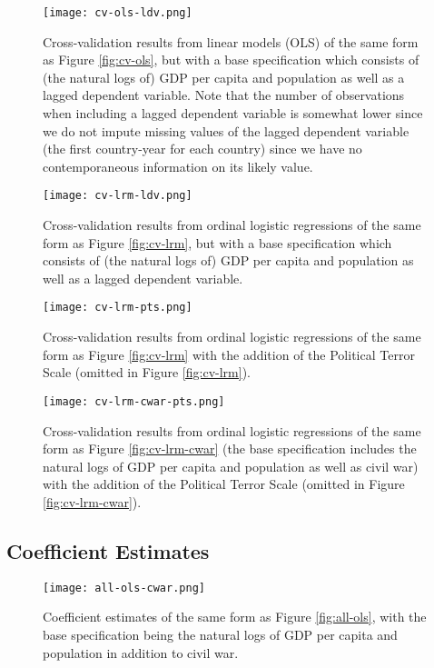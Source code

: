 \documentclass[12pt]{article}
\begin{document}
\begin{figure}[!htpb]
\texttt{[image: cv-ols-ldv.png]}
\caption{Cross-validation results from linear models (OLS) of the same form as Figure \ref{fig:cv-ols}, but with a base specification which consists of (the natural logs of) GDP per capita and population as well as a lagged dependent variable. Note that the number of observations when including a lagged dependent variable is somewhat lower since we do not impute missing values of the lagged dependent variable (the first country-year for each country) since we have no contemporaneous information on its likely value.}
\label{fig:cv-ols-ldv}
\end{figure}

\begin{figure}[!htpb]
\texttt{[image: cv-lrm-ldv.png]}
\caption{Cross-validation results from ordinal logistic regressions of the same form as Figure \ref{fig:cv-lrm}, but with a base specification which consists of (the natural logs of) GDP per capita and population as well as a lagged dependent variable.}
\label{fig:cv-lrm-ldv}
\end{figure}

\begin{figure}[!htpb]
\texttt{[image: cv-lrm-pts.png]}
\caption{Cross-validation results from ordinal logistic regressions of the same form as Figure \ref{fig:cv-lrm} with the addition of the Political Terror Scale (omitted in Figure \ref{fig:cv-lrm}).}
\label{fig:cv-lrm-pts}
\end{figure}

\begin{figure}[!htpb]
\texttt{[image: cv-lrm-cwar-pts.png]}
\caption{Cross-validation results from ordinal logistic regressions of the same form as Figure \ref{fig:cv-lrm-cwar} (the base specification includes the natural logs of GDP per capita and population as well as civil war) with the addition of the Political Terror Scale (omitted in Figure \ref{fig:cv-lrm-cwar}).}
\label{fig:cv-lrm-cwar-pts}
\end{figure}

\clearpage

\subsection{Coefficient Estimates}

\begin{figure}[!htpb]
\texttt{[image: all-ols-cwar.png]}
\caption{Coefficient estimates of the same form as Figure \ref{fig:all-ols}, with the base specification being the natural logs of GDP per capita and population in addition to civil war.}
\label{fig:all-ols-cwar}
\end{figure}
\end{document}

